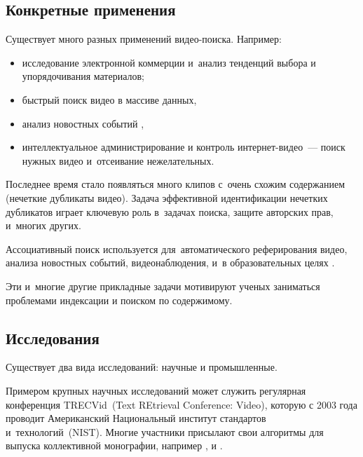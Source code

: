 \subsection{Конкретные применения}

Существует много разных применений видео-поиска. Например:
\begin{itemize}
    \item исследование электронной коммерции
        и~анализ тенденций выбора и упорядочивания материалов;
    \item быстрый поиск видео в массиве данных,
    \item анализ новостных событий \cite{Peng:2005},
    \item интеллектуальное администрирование и контроль интернет-видео~—
        поиск нужных видео и~отсеивание нежелательных.
\end{itemize}

Последнее время стало появляться много клипов
с~очень схожим содержанием (нечеткие дубликаты видео).
Задача эффективной идентификации нечетких дубликатов играет ключевую
роль в~задачах поиска, защите авторских прав, и~многих других.

Ассоциативный поиск используется для~автоматического
реферирования видео, анализа новостных событий,
видеонаблюдения, и~в образовательных целях \cite{Dimitrova:2002}.

Эти и~многие другие прикладные задачи мотивируют ученых заниматься
проблемами индексации и поиском по содержимому.

\subsection{Исследования}

Существует два вида исследований: научные и промышленные.

Примером крупных научных исследований может служить
регулярная конференция TRECVid~(Text REtrieval Conference: Video),
которую с 2003 года проводит Американский Национальный институт
стандартов и~технологий~(NIST).
Многие участники присылают свои алгоритмы для выпуска коллективной монографии,
например \cite{Over:2011}, \cite{Awad:2014} и \cite{Smeaton:2010}.


